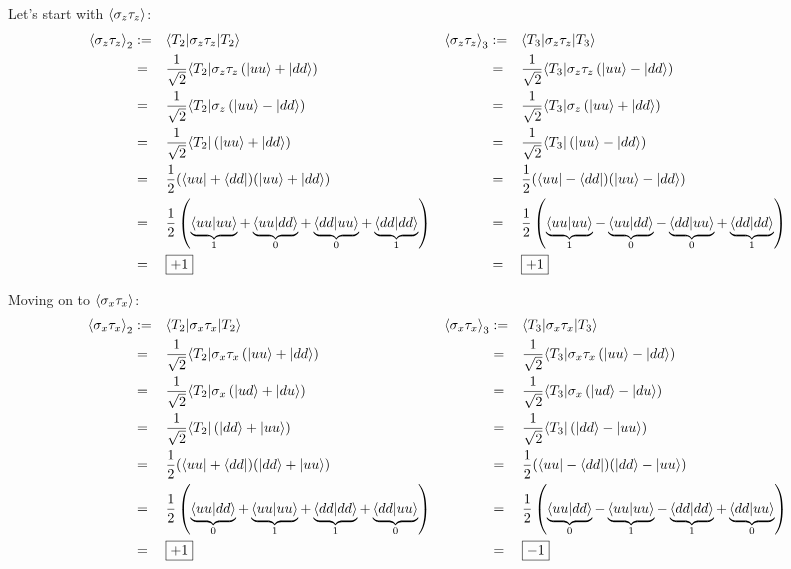 \documentclass[solutions.tex]{subfiles}
\begin{document}
Let's start with $\left\langle \sigma_z\tau_z \right\rangle$:
\begin{equation*}\begin{aligned}
	\left\langle \sigma_z\tau_z \right\rangle_2 &:=&& \langle T_2|\sigma_z\tau_z|T_2\rangle
	& \left\langle \sigma_z\tau_z \right\rangle_3 &:=&& \langle T_3|\sigma_z\tau_z|T_3\rangle \\
	~ &=&& \frac1{\sqrt2}\langle T_2|\sigma_z\tau_z\left(|uu\rangle+|dd\rangle\right)
	& ~ &=&& \frac1{\sqrt2}\langle T_3|\sigma_z\tau_z\left(|uu\rangle-|dd\rangle\right) \\
	~ &=&& \frac1{\sqrt2}\langle T_2|\sigma_z\left(|uu\rangle-|dd\rangle\right)
	& ~ &=&& \frac1{\sqrt2}\langle T_3|\sigma_z\left(|uu\rangle+|dd\rangle\right) \\
	~ &=&& \frac1{\sqrt2}\langle T_2|\left(|uu\rangle+|dd\rangle\right)
	& ~ &=&& \frac1{\sqrt2}\langle T_3|\left(|uu\rangle-|dd\rangle\right) \\
	~ &=&& \frac12(\langle uu|+\langle dd|)(|uu\rangle+|dd\rangle)
	& ~ &=&& \frac12(\langle uu|-\langle dd|)(|uu\rangle-|dd\rangle) \\
	~ &=&& \frac12\left(
		\underbrace{\left\langle uu \middle| uu \right\rangle}_{1}
		+\underbrace{\left\langle uu \middle| dd \right\rangle}_{0}
		+\underbrace{\left\langle dd \middle| uu \right\rangle}_{0}
		+\underbrace{\left\langle dd \middle| dd \right\rangle}_{1}
	\right)
	& ~ &=&& \frac12\left(
		\underbrace{\left\langle uu \middle| uu \right\rangle}_{1}
		-\underbrace{\left\langle uu \middle| dd \right\rangle}_{0}
		-\underbrace{\left\langle dd \middle| uu \right\rangle}_{0}
		+\underbrace{\left\langle dd \middle| dd \right\rangle}_{1}
	\right) \\
	~ &=&& \boxed{+1}
	& ~ &=&& \boxed{+1}
\end{aligned}\end{equation*}

Moving on to $\left\langle \sigma_x\tau_x \right\rangle$:
\begin{equation*}\begin{aligned}
	\left\langle \sigma_x\tau_x \right\rangle_2 &:=&& \langle T_2|\sigma_x\tau_x|T_2\rangle
	& \left\langle \sigma_x\tau_x \right\rangle_3 &:=&& \langle T_3|\sigma_x\tau_x|T_3\rangle \\
	~ &=&& \frac1{\sqrt2}\langle T_2|\sigma_x\tau_x\left(|uu\rangle+|dd\rangle\right)
	& ~ &=&& \frac1{\sqrt2}\langle T_3|\sigma_x\tau_x\left(|uu\rangle-|dd\rangle\right) \\
	~ &=&& \frac1{\sqrt2}\langle T_2|\sigma_x\left(|ud\rangle+|du\rangle\right)
	& ~ &=&& \frac1{\sqrt2}\langle T_3|\sigma_x\left(|ud\rangle-|du\rangle\right) \\
	~ &=&& \frac1{\sqrt2}\langle T_2|\left(|dd\rangle+|uu\rangle\right)
	& ~ &=&& \frac1{\sqrt2}\langle T_3|\left(|dd\rangle-|uu\rangle\right) \\
	~ &=&& \frac12(\langle uu|+\langle dd|)(|dd\rangle+|uu\rangle)
	& ~ &=&& \frac12(\langle uu|-\langle dd|)(|dd\rangle-|uu\rangle) \\
	~ &=&& \frac12\left(
		\underbrace{\left\langle uu \middle| dd \right\rangle}_{0}
		+\underbrace{\left\langle uu \middle| uu \right\rangle}_{1}
		+\underbrace{\left\langle dd \middle| dd \right\rangle}_{1}
		+\underbrace{\left\langle dd \middle| uu \right\rangle}_{0}
	\right)
	& ~ &=&& \frac12\left(
		\underbrace{\left\langle uu \middle| dd \right\rangle}_{0}
		-\underbrace{\left\langle uu \middle| uu \right\rangle}_{1}
		-\underbrace{\left\langle dd \middle| dd \right\rangle}_{1}
		+\underbrace{\left\langle dd \middle| uu \right\rangle}_{0}
	\right) \\
	~ &=&& \boxed{+1}
	& ~ &=&& \boxed{-1}
\end{aligned}\end{equation*}
\end{document}
